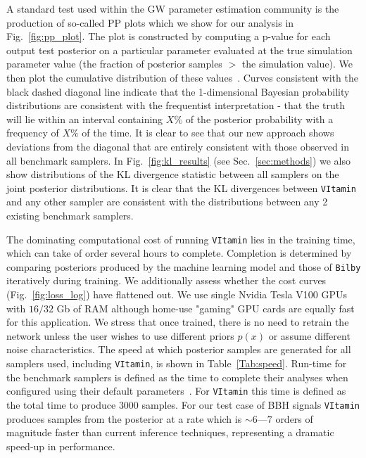 \documentclass[%
showpacs,
 amsmath,amssymb,
 aps,
 twocolumn,
 prl,
 reprint,
floatfix,
]{revtex4-1}
\newcommand{\chris}[1]{\textbf{\textcolor{red}{CHRIS: #1}}}
\begin{document}
%
%
A standard test used within the \ac{GW} parameter estimation community is the
production of so-called \ac{PP} plots which we show for our analysis in
Fig.~\ref{fig:pp_plot}. The plot is constructed by computing a p-value for each
output test posterior on a particular parameter evaluated at the true
simulation parameter value (the fraction of posterior samples $>$ the
simulation value). We then plot the cumulative distribution of these
values~\cite{1409.7215}. Curves consistent with the black dashed diagonal line
indicate that the 1-dimensional Bayesian probability distributions are
consistent with the frequentist interpretation - that the truth will lie within
an interval containing $X\%$ of the posterior probability with a frequency of
$X\%$ of the time. It is clear to see that our new approach shows deviations
from the diagonal that are entirely consistent with those observed in all
benchmark samplers. In Fig.~\ref{fig:kl_results} (see Sec.~\ref{sec:methods}) we
also show distributions of the \ac{KL} divergence statistic between all
samplers on the joint posterior distributions. It is clear that the \ac{KL}
divergences between \texttt{VItamin} and any other sampler are consistent with the
distributions between any 2 existing benchmark samplers.      

%
%
The dominating computational cost of running \texttt{VItamin} lies in the
training time, which can take of order several hours to complete.  Completion
is determined by comparing posteriors produced by the machine learning model
and those of \texttt{Bilby} iteratively during training. We additionally assess
whether the cost curves (Fig.~\ref{fig:loss_log}) have flattened out. We use
single Nvidia Tesla V100 \acp{GPU} with $16/32$ Gb of RAM although home-use
"gaming" \ac{GPU} cards are equally fast for this application. We stress that
once trained, there is no need to retrain the network unless the user wishes to
use different priors $p(x)$ or assume different noise characteristics.   The
speed at which posterior samples are generated for all samplers used, including
\texttt{VItamin}, is shown in Table~\ref{Tab:speed}. Run-time for the benchmark
samplers is defined as the time to complete their analyses when configured
using their default parameters~\cite{1811.02042}. For \texttt{VItamin} this
time is defined as the total time to produce $3000$ samples. For our test case
of \ac{BBH} signals \texttt{VItamin} produces samples from the posterior at a
rate which is $\sim 6$---$7$ orders of magnitude faster than current inference
techniques, representing a dramatic speed-up in performance. 
\end{document}

